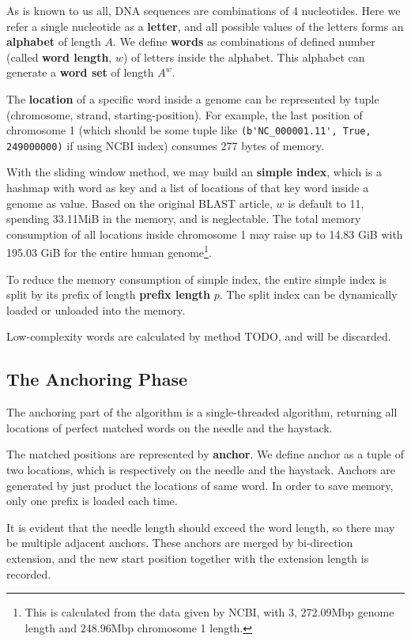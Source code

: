 \documentclass[10pt,final,journal,twocolumn,a4paper]{IEEEtran}
\begin{document}
As is known to us all, DNA sequences are combinations of 4 nucleotides. Here we refer a single nucleotide as a \textbf{letter}, and all possible values of the letters forms an \textbf{alphabet} of length $A$. We define \textbf{words} as combinations of defined number (called \textbf{word length}, $w$) of letters inside the alphabet. This alphabet can generate a \textbf{word set} of length $A^{w}$.

The \textbf{location} of a specific word inside a genome can be represented by tuple (chromosome, strand, starting-position). For example, the last position of chromosome 1 (which should be some tuple like \verb|(b'NC_000001.11', True, 249000000)| if using NCBI index) consumes 277 bytes of memory.

With the sliding window method, we may build an \textbf{simple index}, which is a hashmap with word as key and a list of locations of that key word inside a genome as value. Based on the original BLAST article, $w$ is default to 11, spending 33.11MiB in the memory, and is neglectable. The total memory consumption of all locations inside chromosome 1 may raise up to 14.83 GiB with 195.03 GiB for the entire human genome\footnote{This is calculated from the data given by NCBI, with 3, 272.09Mbp genome length and 248.96Mbp chromosome 1 length.}.

To reduce the memory consumption of simple index, the entire simple index is split by its prefix of length \textbf{prefix length} $p$. The split index can be dynamically loaded or unloaded into the memory.

Low-complexity words are calculated by method TODO, and will be discarded.

\subsection{The \textbf{Anchoring} Phase}

The anchoring part of the algorithm is a single-threaded algorithm, returning all locations of perfect matched words on the needle and the haystack.

The matched positions are represented by \textbf{anchor}. We define anchor as a tuple of two locations, which is respectively on the needle and the haystack. Anchors are generated by just product the locations of same word. In order to save memory, only one prefix is loaded each time.

It is evident that the needle length should exceed the word length, so there may be multiple adjacent anchors. These anchors are merged by bi-direction extension, and the new start position together with the extension length is recorded.
\end{document}
